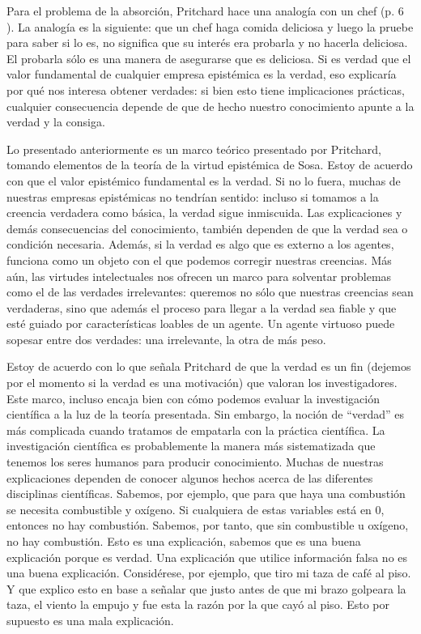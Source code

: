 \documentclass[12pt]{article}
\begin{document}
Para el problema de la absorción, Pritchard hace una analogía con un chef (p. 6 ). La analogía es la siguiente:  que un chef haga comida deliciosa y luego la pruebe para saber si lo es, no significa que su interés era probarla y no hacerla deliciosa. El probarla sólo es una manera de asegurarse que es deliciosa. Si es verdad que el valor fundamental de cualquier empresa epistémica es la verdad, eso explicaría por qué nos interesa obtener verdades: si bien esto tiene implicaciones prácticas, cualquier consecuencia depende de que de hecho nuestro conocimiento apunte a la verdad y la consiga. 

Lo presentado anteriormente es un marco teórico presentado por Pritchard, tomando elementos de la teoría de la virtud epistémica de Sosa. Estoy de acuerdo con que el valor epistémico fundamental es la verdad. Si no lo fuera, muchas de nuestras empresas epistémicas no tendrían sentido: incluso si tomamos a la creencia verdadera como básica, la verdad sigue inmiscuida. Las explicaciones y demás consecuencias del conocimiento, también dependen de que la verdad sea o condición necesaria. Además, si la verdad es algo que es externo a los agentes, funciona como un objeto con el que podemos corregir nuestras creencias. Más aún, las virtudes intelectuales nos ofrecen un marco para solventar problemas como el de las verdades irrelevantes: queremos no sólo que nuestras creencias sean verdaderas, sino que además el proceso para llegar a la verdad sea fiable y que esté guiado por características loables de un agente. Un agente virtuoso puede sopesar entre dos verdades: una irrelevante, la otra de más peso.

Estoy de acuerdo con lo que señala Pritchard de que la verdad es un fin (dejemos por el momento si la verdad es una motivación) que valoran los investigadores. Este marco, incluso encaja bien con cómo podemos evaluar la investigación científica a la luz de la teoría presentada. Sin embargo, la noción de ``verdad'' es más complicada cuando tratamos de empatarla con la práctica científica. La investigación científica es probablemente la manera más sistematizada que tenemos los seres humanos para producir conocimiento. Muchas de nuestras explicaciones dependen de conocer algunos hechos acerca de las diferentes disciplinas científicas. Sabemos, por ejemplo, que para que haya una combustión se necesita combustible y oxígeno. Si cualquiera de estas variables está en 0, entonces no hay combustión. Sabemos, por tanto, que sin combustible u oxígeno, no hay combustión. Esto es una explicación, sabemos que es una buena explicación porque es verdad. Una explicación que utilice información falsa no es una buena explicación. Considérese, por ejemplo, que tiro mi taza de café al piso. Y que explico esto en base a señalar que justo antes de que mi brazo golpeara la taza, el viento la empujo y fue esta la razón por la que cayó al piso. Esto por supuesto es una mala explicación.
\end{document}

